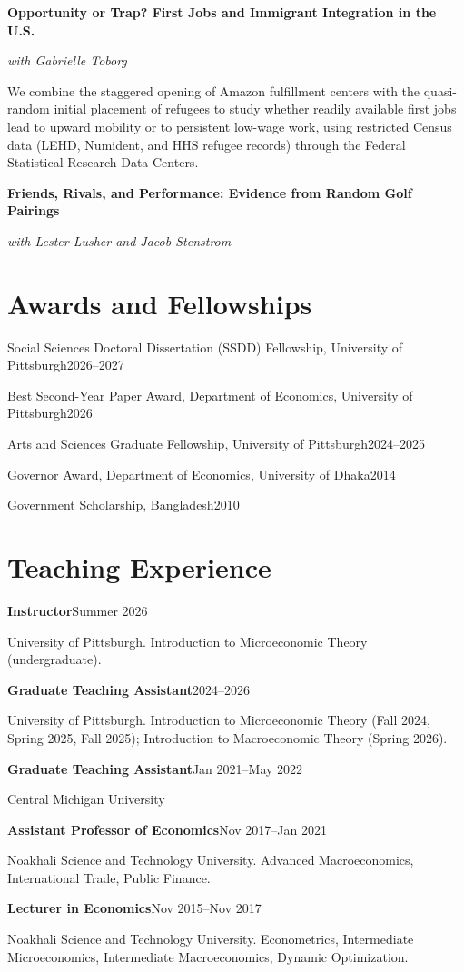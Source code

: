 \documentclass[11pt]{article}
\newcommand{\cvitem}[2]{%
  \textbf{#1}\hfill #2\par\nopagebreak
}
\newcommand{\cvline}[2]{%
  #1\hfill #2\par
}
\begin{document}
\textbf{Opportunity or Trap? First Jobs and Immigrant Integration in the U.S.}\par
\textit{with Gabrielle Toborg}\par
We combine the staggered opening of Amazon fulfillment centers with the quasi-random initial
placement of refugees to study whether readily available first jobs lead to upward mobility or to
persistent low-wage work, using restricted Census data (LEHD, Numident, and HHS refugee records)
through the Federal Statistical Research Data Centers.
\vspace{0.5em}

\textbf{Friends, Rivals, and Performance: Evidence from Random Golf Pairings}\par
\textit{with Lester Lusher and Jacob Stenstrom}

\section*{Awards and Fellowships}
\cvline{Social Sciences Doctoral Dissertation (SSDD) Fellowship, University of Pittsburgh}{2026--2027}
\cvline{Best Second-Year Paper Award, Department of Economics, University of Pittsburgh}{2026}
\cvline{Arts and Sciences Graduate Fellowship, University of Pittsburgh}{2024--2025}
\cvline{Governor Award, Department of Economics, University of Dhaka}{2014}
\cvline{Government Scholarship, Bangladesh}{2010}

\section*{Teaching Experience}
\cvitem{Instructor}{Summer 2026}
University of Pittsburgh. Introduction to Microeconomic Theory (undergraduate).

\cvitem{Graduate Teaching Assistant}{2024--2026}
University of Pittsburgh. Introduction to Microeconomic Theory (Fall 2024, Spring 2025,
Fall 2025); Introduction to Macroeconomic Theory (Spring 2026).

\cvitem{Graduate Teaching Assistant}{Jan 2021--May 2022}
Central Michigan University

\cvitem{Assistant Professor of Economics}{Nov 2017--Jan 2021}
Noakhali Science and Technology University. Advanced Macroeconomics, International Trade,
Public Finance.

\cvitem{Lecturer in Economics}{Nov 2015--Nov 2017}
Noakhali Science and Technology University. Econometrics, Intermediate Microeconomics,
Intermediate Macroeconomics, Dynamic Optimization.
\end{document}
